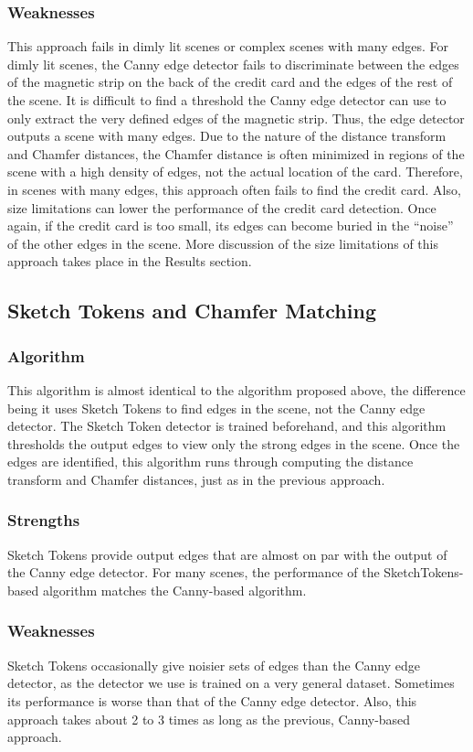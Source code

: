 \documentclass[10pt,twocolumn,letterpaper]{article}
\begin{document}
\subsubsection{Weaknesses}
	This approach fails in dimly lit scenes or complex scenes with many edges. For dimly lit scenes, the Canny edge detector fails to discriminate between the edges of the magnetic strip on the back of the credit card and the edges of the rest of the scene. It is difficult to find a threshold the Canny edge detector can use to only extract the very defined edges of the magnetic strip. Thus, the edge detector outputs a scene with many edges. Due to the nature of the distance transform and Chamfer distances, the Chamfer distance is often minimized in regions of the scene with a high density of edges, not the actual location of the card. Therefore, in scenes with many edges, this approach often fails to find the credit card.
Also, size limitations can lower the performance of the credit card detection. Once again, if the credit card is too small, its edges can become buried in the “noise” of the other edges in the scene. More discussion of the size limitations of this approach takes place in the Results section.

\subsection{Sketch Tokens and Chamfer Matching}
\subsubsection{Algorithm}
	This algorithm is almost identical to the algorithm proposed above, the difference being it uses Sketch Tokens to find edges in the scene, not the Canny edge detector. The Sketch Token detector is trained beforehand, and this algorithm thresholds the output edges to view only the strong edges in the scene. Once the edges are identified, this algorithm runs through computing the distance transform and Chamfer distances, just as in the previous approach.
\subsubsection{Strengths}
	Sketch Tokens provide output edges that are almost on par with the output of the Canny edge detector. For many scenes, the performance of the SketchTokens-based algorithm matches the Canny-based algorithm.
\subsubsection{Weaknesses}
	Sketch Tokens occasionally give noisier sets of edges than the Canny edge detector, as the detector we use is trained on a very general dataset. Sometimes its performance is worse than that of the Canny edge detector. Also, this approach takes about 2 to 3 times as long as the previous, Canny-based approach. 
\end{document}
